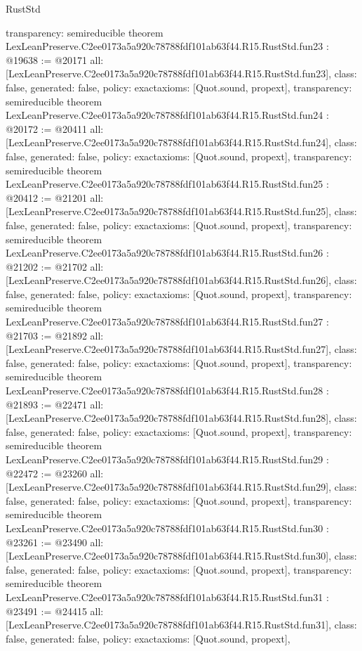 \begin{lexlean}{RustStd}
\begin{coremodule}
{  transparency: semireducible
}
theorem LexLeanPreserve.C2ee0173a5a920c78788fdf101ab63f44.R15.RustStd.fun23 : @19638 := @20171 {
  all: [LexLeanPreserve.C2ee0173a5a920c78788fdf101ab63f44.R15.RustStd.fun23],
  class: false,
  generated: false,
  policy: exact{axioms: [Quot.sound, propext]},
  transparency: semireducible
}
theorem LexLeanPreserve.C2ee0173a5a920c78788fdf101ab63f44.R15.RustStd.fun24 : @20172 := @20411 {
  all: [LexLeanPreserve.C2ee0173a5a920c78788fdf101ab63f44.R15.RustStd.fun24],
  class: false,
  generated: false,
  policy: exact{axioms: [Quot.sound, propext]},
  transparency: semireducible
}
theorem LexLeanPreserve.C2ee0173a5a920c78788fdf101ab63f44.R15.RustStd.fun25 : @20412 := @21201 {
  all: [LexLeanPreserve.C2ee0173a5a920c78788fdf101ab63f44.R15.RustStd.fun25],
  class: false,
  generated: false,
  policy: exact{axioms: [Quot.sound, propext]},
  transparency: semireducible
}
theorem LexLeanPreserve.C2ee0173a5a920c78788fdf101ab63f44.R15.RustStd.fun26 : @21202 := @21702 {
  all: [LexLeanPreserve.C2ee0173a5a920c78788fdf101ab63f44.R15.RustStd.fun26],
  class: false,
  generated: false,
  policy: exact{axioms: [Quot.sound, propext]},
  transparency: semireducible
}
theorem LexLeanPreserve.C2ee0173a5a920c78788fdf101ab63f44.R15.RustStd.fun27 : @21703 := @21892 {
  all: [LexLeanPreserve.C2ee0173a5a920c78788fdf101ab63f44.R15.RustStd.fun27],
  class: false,
  generated: false,
  policy: exact{axioms: [Quot.sound, propext]},
  transparency: semireducible
}
theorem LexLeanPreserve.C2ee0173a5a920c78788fdf101ab63f44.R15.RustStd.fun28 : @21893 := @22471 {
  all: [LexLeanPreserve.C2ee0173a5a920c78788fdf101ab63f44.R15.RustStd.fun28],
  class: false,
  generated: false,
  policy: exact{axioms: [Quot.sound, propext]},
  transparency: semireducible
}
theorem LexLeanPreserve.C2ee0173a5a920c78788fdf101ab63f44.R15.RustStd.fun29 : @22472 := @23260 {
  all: [LexLeanPreserve.C2ee0173a5a920c78788fdf101ab63f44.R15.RustStd.fun29],
  class: false,
  generated: false,
  policy: exact{axioms: [Quot.sound, propext]},
  transparency: semireducible
}
theorem LexLeanPreserve.C2ee0173a5a920c78788fdf101ab63f44.R15.RustStd.fun30 : @23261 := @23490 {
  all: [LexLeanPreserve.C2ee0173a5a920c78788fdf101ab63f44.R15.RustStd.fun30],
  class: false,
  generated: false,
  policy: exact{axioms: [Quot.sound, propext]},
  transparency: semireducible
}
theorem LexLeanPreserve.C2ee0173a5a920c78788fdf101ab63f44.R15.RustStd.fun31 : @23491 := @24415 {
  all: [LexLeanPreserve.C2ee0173a5a920c78788fdf101ab63f44.R15.RustStd.fun31],
  class: false,
  generated: false,
  policy: exact{axioms: [Quot.sound, propext]},
}
\end{coremodule}
\end{lexlean}

